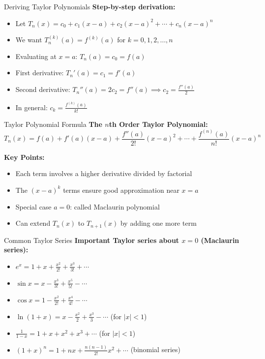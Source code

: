 \documentclass[aspectratio=169]{beamer}
\begin{document}
\begin{frame}{Deriving Taylor Polynomials}
\textbf{Step-by-step derivation:}
\begin{itemize}
    \item Let $T_n(x) = c_0 + c_1(x-a) + c_2(x-a)^2 + \cdots + c_n(x-a)^n$
    \item We want $T_n^{(k)}(a) = f^{(k)}(a)$ for $k = 0, 1, 2, \ldots, n$
    \item Evaluating at $x = a$: $T_n(a) = c_0 = f(a)$
    \item First derivative: $T_n'(a) = c_1 = f'(a)$
    \item Second derivative: $T_n''(a) = 2c_2 = f''(a) \implies c_2 = \frac{f''(a)}{2}$
    \item In general: $c_k = \frac{f^{(k)}(a)}{k!}$
\end{itemize}
\end{frame}

\begin{frame}{Taylor Polynomial Formula}
\textbf{The $n$th Order Taylor Polynomial:}
\[T_n(x) = f(a) + f'(a)(x-a) + \frac{f''(a)}{2!}(x-a)^2 + \cdots + \frac{f^{(n)}(a)}{n!}(x-a)^n\]

\textbf{Key Points:}
\begin{itemize}
    \item Each term involves a higher derivative divided by factorial
    \item The $(x-a)^k$ terms ensure good approximation near $x = a$
    \item Special case $a = 0$: called Maclaurin polynomial
    \item Can extend $T_n(x)$ to $T_{n+1}(x)$ by adding one more term
\end{itemize}
\end{frame}

\begin{frame}{Common Taylor Series}
\textbf{Important Taylor series about $x = 0$ (Maclaurin series):}
\begin{itemize}
    \item $e^x = 1 + x + \frac{x^2}{2!} + \frac{x^3}{3!} + \cdots$
    \item $\sin x = x - \frac{x^3}{3!} + \frac{x^5}{5!} - \cdots$
    \item $\cos x = 1 - \frac{x^2}{2!} + \frac{x^4}{4!} - \cdots$
    \item $\ln(1+x) = x - \frac{x^2}{2} + \frac{x^3}{3} - \cdots$ (for $|x| < 1$)
    \item $\frac{1}{1-x} = 1 + x + x^2 + x^3 + \cdots$ (for $|x| < 1$)
    \item $(1+x)^n = 1 + nx + \frac{n(n-1)}{2!}x^2 + \cdots$ (binomial series)
\end{itemize}
\end{frame}
\end{document}
